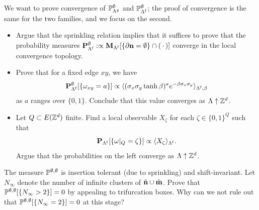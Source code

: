 \begin{exercise}
    We want to prove convergence
    of $\P_{\Lambda^\frakg}^\emptyset$ and $\P_{\Lambda^\f}^\emptyset$;
    the proof of convergence is the same for the two families,
    and we focus on the second.
    \begin{itemize}
        \item Argue that the sprinkling relation implies that it suffices to prove that
            the probability measures
            $\bfP_{\Lambda^\f}^\emptyset:\propto\bfM_{\Lambda^\f}[\{\partial\n=\emptyset\}\cap(\blank)]$
            converge in the local convergence topology.
        \item Prove that for a fixed edge $xy$,
            we have
            \[
                \bfP_{\Lambda^\f}^\emptyset[\{\omega_{xy}=a\}]\propto
                \langle
                (\sigma_x\sigma_y\tanh\beta)^a e^{-\beta\sigma_x\sigma_y}
                \rangle_{\Lambda^\f,\beta}
            \]
            as $a$ ranges over $\{0,1\}$.
            Conclude that this value converges as $\Lambda\uparrow\Z^d$.
        \item Let $Q\subset E(\Z^d)$ finite.
            Find a local observable $X_\zeta$ for each $\zeta\in\{0,1\}^Q$ such that
            \[
                \bfP_{\Lambda^\f}[\{\omega|_Q=\zeta\}]\propto \langle X_\zeta\rangle_{\Lambda^\f}.
            \]
            Argue that the probabilities on the left converge as $\Lambda\uparrow\Z^d$.
    \end{itemize}
\end{exercise}

\begin{exercise}
    The measure $\P^{\emptyset,\emptyset}$ is insertion tolerant (due to sprinkling)
    and shift-invariant.
    Let $N_\infty$ denote the number of infinite clusters of $\hat\n\cup\hat\m$.
    Prove that $\P^{\emptyset,\emptyset}[\{N_\infty>2\}]=0$
    by appealing to trifurcation boxes.
    Why can we not rule out that $\P^{\emptyset,\emptyset}[\{N_\infty=2\}]=0$
    at this stage?
\end{exercise}

